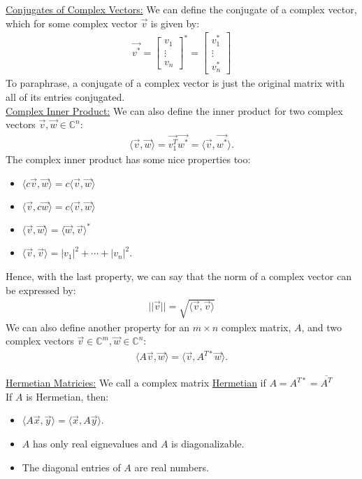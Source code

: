 \documentclass{article}
\newcommand{\gap}{\medskip\\}
\newcommand{\sheader}[1]{\underline{#1:}}
\begin{document}
\sheader{Conjugates of Complex Vectors} We can define the conjugate of a complex vector, which for some complex vector $\vec{v}$
is given by:
\begin{align*}
    \vec{v^*} = \begin{bmatrix}
        v_1 \\
        \vdots \\
        v_n
    \end{bmatrix}^*
    = \begin{bmatrix}
        v_1^*\\
        \vdots\\
        v_n^*
    \end{bmatrix}
\end{align*}
To paraphrase, a conjugate of a complex vector is just the original matrix with all of 
its entries conjugated.
\gap
\sheader{Complex Inner Product} We can also define the inner product for two complex vectors
$\vec{v}, \vec{w} \in \mathbb{C}^n$:
\begin{align*}
    \langle \vec{v}, \vec{w} \rangle = \vec{v_1^T} \vec{w^*} = \langle \vec{v}, \vec{w^*} \rangle.
\end{align*}
The complex inner product has some nice properties too:
\begin{itemize}
    \item $\langle c\vec{v}, \vec{w} \rangle = c \langle \vec{v}, \vec{w} \rangle$
    \item $\langle \vec{v}, c\vec{w} \rangle = c \langle \vec{v}, \vec{w} \rangle$
    \item $\langle \vec{v}, \vec{w} \rangle = \langle \vec{w}, \vec{v} \rangle^*$
    \item $\langle \vec{v}, \vec{v} \rangle = |v_1|^2 + \cdots + |v_n|^2$.
\end{itemize}
Hence, with the last property, we can say that the norm of a complex vector can be expressed by:
\begin{align*}
    ||\vec{v}|| = \sqrt{\langle \vec{v}, \vec{v} \rangle}
\end{align*}
We can also define another property for an $m \times n$ complex matrix, $A$, 
and two complex vectors $\vec{v} \in \mathbb{C}^m, \vec{w} \in \mathbb{C}^n$:
\begin{align*}
    \langle A\vec{v}, \vec{w} \rangle = \langle \vec{v}, A^{T*} \vec{w} \rangle.
\end{align*}
\pagebreak

\sheader{Hermetian Matricies} We call a complex matrix \underline{Hermetian} if $A = A^{T*} = \overline{A^T}$
\gap
If $A$ is Hermetian, then:
\begin{itemize}
    \item $\langle A\vec{x}, \vec{y} \rangle = \langle \vec{x}, A\vec{y} \rangle$.
    \item $A$ has only real eignevalues and $A$ is diagonalizable.
    \item The diagonal entries of $A$ are real numbers.
\end{itemize}
\end{document}
